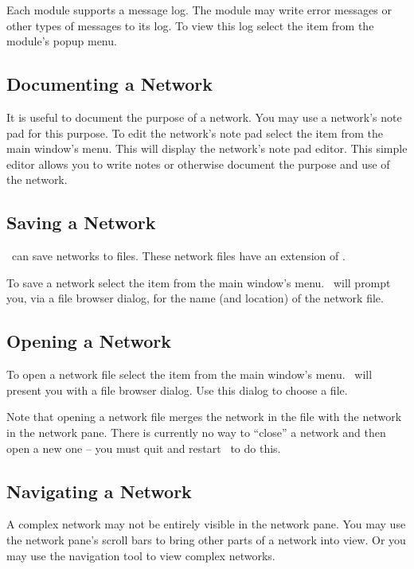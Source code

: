 Each module supports a message log.  The module may write error messages or
other types of messages to its log.  To view this log select the
 item from the module's popup menu.

\subsection{Documenting a Network}
\label{sec:docnetwork}

It is useful to document the purpose of a network.  You may use a network's
note pad for this purpose.  To edit the network's note pad select the
 item from the main window's  menu.  This
will display the network's note pad editor.  This simple editor allows you
to write notes or otherwise document the purpose and use of the network.


\subsection{Saving a Network}
\label{sec:savenet}

\sr\ can save networks to files.  These network files have an extension of
.  

To save a network select the  item from the main window's
 menu.  \sr\ will prompt you, via a file browser dialog, for the
name (and location) of the network file.


\subsection{Opening a Network}
\label{sec:opennet}

To open a network file select the  item from the main
window's  menu.  \sr\ will present you with a file browser
dialog.  Use this dialog to choose a  file.

Note that opening a network file merges the network in the file with the
network in the network pane.  There is currently no way to ``close'' a
network and then open a new one -- you must quit and restart \sr\ to do
this.

\subsection{Navigating a Network}
\label{sec:navnetwork}

A complex network may not be entirely visible in the network pane.  You may
use the network pane's scroll bars to bring other parts of a network into
view.  Or you may use the navigation tool to view complex networks.


